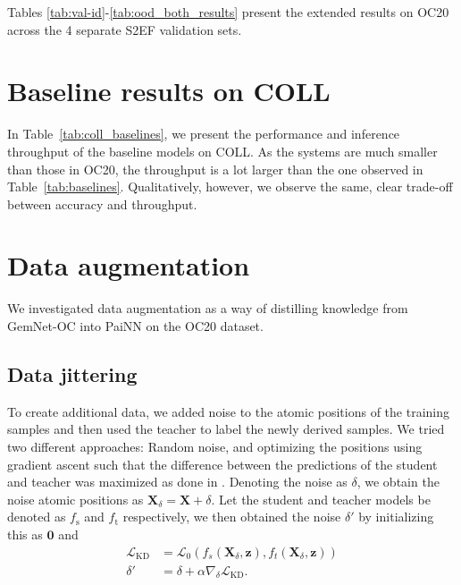\documentclass{article}
\newcommand{\loss}{\mathcal{L}}
\begin{document}
Tables \ref{tab:val-id}-\ref{tab:ood_both_results} present the extended results on OC20 across the 4 separate S2EF validation sets.









\newpage
\section{Baseline results on COLL}
\label{ap:coll_baseline}
In Table~\ref{tab:coll_baselines}, we present the performance and inference throughput of the baseline models on COLL. As the systems are much smaller than those in OC20, the throughput is a lot larger than the one observed in Table~\ref{tab:baselines}. Qualitatively, however, we observe the same, clear trade-off between accuracy and throughput.


\newpage
\section{Data augmentation}
\label{ap:data_aug}
We investigated data augmentation as a way of distilling knowledge from GemNet-OC into PaiNN on the OC20 dataset.  

\subsection{Data jittering} 
\label{ap:jittering}
To create additional data, we added noise to the atomic positions of the training samples and then used the teacher to label the newly derived samples. We tried two different approaches: Random noise, and optimizing the positions using gradient ascent such that the difference between the predictions of the student and teacher was maximized as done in \cite{schwalbe-koda_differentiable_2021}. Denoting the noise as $\delta$, we obtain the noise atomic positions as $\boldsymbol{X}_\delta = \boldsymbol{X} + \delta$. Let the student and teacher models be denoted as $f_\text{s}$ and $f_\text{t}$ respectively, we then obtained the noise $\delta'$ by initializing this as $\boldsymbol{0}$ and
\begin{align*}
            \loss_{\text{KD}} &= \loss_0(f_s(\boldsymbol{X}_{\delta}, \boldsymbol{z}), f_t(\boldsymbol{X}_{\delta}, \boldsymbol{z})) \\
            \delta' &= \delta + \alpha \nabla_{\delta} \mathcal{L}_{\text{KD}}.
\end{align*}
\end{document}
